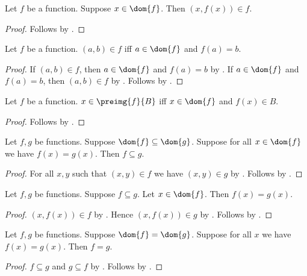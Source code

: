 \begin{proposition}\label{function_apply_elim}
    Let $f$ be a function.
    Suppose $x\in\dom{f}$.
    Then $(x,f(x))\in f$.
\end{proposition}
\begin{proof}
    Follows by .
\end{proof}

\begin{proposition}\label{function_apply_iff}
    Let $f$ be a function.
    $(a,b)\in f$ iff $a\in\dom{f}$ and $f(a) = b$.
\end{proposition}
\begin{proof}
    If $(a,b)\in f$, then $a\in\dom{f}$ and $f(a) = b$
        by .
    If $a\in\dom{f}$ and $f(a) = b$, then $(a,b)\in f$
        by .
    Follows by \auto.
\end{proof}

\begin{proposition}\label{function_preimage_iff}
    Let $f$ be a function.
    $x\in\preimg{f}{B}$ iff $x\in\dom{f}$ and $f(x)\in B$.
\end{proposition}
\begin{proof}
    Follows by .
\end{proof}

\begin{proposition}\label{fun_subseteq}
    Let $f, g$ be functions.
    Suppose $\dom{f}\subseteq \dom{g}$.
    Suppose for all $x\in\dom{f}$ we have $f(x) = g(x)$.
    Then $f\subseteq g$.
\end{proposition}
\begin{proof}
    For all $x,y$ such that $(x,y)\in f$ we have $(x,y)\in g$
        by .
    Follows by .
\end{proof}

\begin{proposition}\label{subfunction_apply}
    Let $f,g$ be functions.
    Suppose $f\subseteq g$.
    Let $x\in\dom{f}$.
    Then $f(x)=g(x)$.
\end{proposition}
\begin{proof}
    $(x,f(x))\in f$ by .
    Hence $(x,f(x))\in g$ by .
    Follows by .
\end{proof}

\begin{proposition}\label{funext}
    Let $f, g$ be functions.
    Suppose $\dom{f} = \dom{g}$.
    Suppose for all $x$ we have  $f(x) = g(x)$.
    Then $f = g$.
\end{proposition}
\begin{proof}
    $f\subseteq g$ and $g\subseteq f$ by .
    Follows by .
\end{proof}

